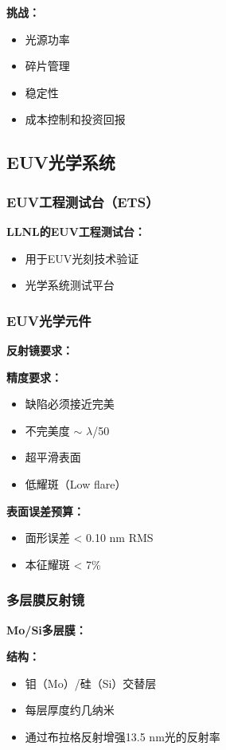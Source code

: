 \documentclass[UTF8,12pt,a4paper]{ctexart}
\begin{document}
\textbf{挑战：}
\begin{itemize}
    \item 光源功率
    \item 碎片管理
    \item 稳定性
    \item 成本控制和投资回报
\end{itemize}

\subsection{EUV光学系统}

\subsubsection{EUV工程测试台（ETS）}

\textbf{LLNL的EUV工程测试台：}
\begin{itemize}
    \item 用于EUV光刻技术验证
    \item 光学系统测试平台
\end{itemize}

\subsubsection{EUV光学元件}

\textbf{反射镜要求：}

\textbf{精度要求：}
\begin{itemize}
    \item 缺陷必须接近完美
    \item 不完美度 $\sim$ $\lambda$/50
    \item 超平滑表面
    \item 低耀斑（Low flare）
\end{itemize}

\textbf{表面误差预算：}
\begin{itemize}
    \item 面形误差 < 0.10 nm RMS
    \item 本征耀斑 < 7\%
\end{itemize}

\subsubsection{多层膜反射镜}

\textbf{Mo/Si多层膜：}

\textbf{结构：}
\begin{itemize}
    \item 钼（Mo）/硅（Si）交替层
    \item 每层厚度约几纳米
    \item 通过布拉格反射增强13.5 nm光的反射率
\end{itemize}
\end{document}
